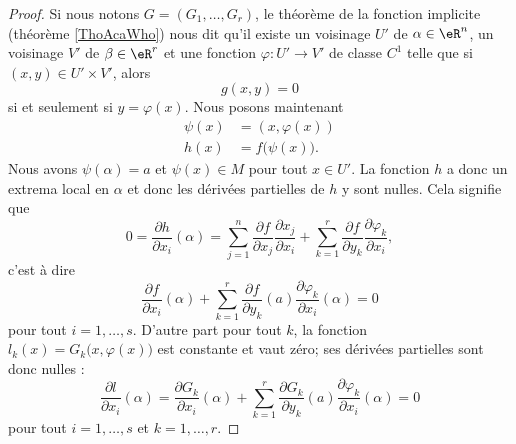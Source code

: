 \begin{proof}
    Si nous notons \( G=(G_1,\ldots, G_r)\), le théorème de la fonction implicite (théorème \ref{ThoAcaWho})  nous dit qu'il existe un voisinage \( U'\) de \( \alpha\in \eR^n\), un voisinage \( V'\) de \( \beta\in \eR^r\) et une fonction \( \varphi\colon U'\to V'\) de classe \( C^1\) telle que si \( (x,y)\in U'\times V'\), alors
    \begin{equation}
        g(x,y)=0
    \end{equation}
    si et seulement si \( y=\varphi(x)\). Nous posons maintenant
    \begin{subequations}
        \begin{align}
            \psi(x)&=(x,\varphi(x))\\
            h(x)&=f\big( \psi(x) \big).
        \end{align}
    \end{subequations}
    Nous avons \( \psi(\alpha)=a\) et \( \psi(x)\in M\) pour tout \( x\in U'\). La fonction \( h\) a donc un extrema local en \( \alpha\) et donc les dérivées partielles de \( h\) y sont nulles. Cela signifie que
    \begin{equation}
        0=\frac{ \partial h }{ \partial x_i }(\alpha)=\sum_{j=1}^n\frac{ \partial f }{ \partial x_j }\frac{ \partial x_j }{ \partial x_i }+\sum_{k=1}^r\frac{ \partial f }{ \partial y_k }\frac{ \partial \varphi_k }{ \partial x_i },
    \end{equation}
    c'est à dire
    \begin{equation}
        \frac{ \partial f }{ \partial x_i }(\alpha)+\sum_{k=1}^r\frac{ \partial f }{ \partial y_k }(a)\frac{ \partial \varphi_k }{ \partial x_i }(\alpha)=0
    \end{equation}
    pour tout \( i=1,\ldots, s\). D'autre part pour tout $k$, la fonction \( l_k(x)=G_k\big( x,\varphi(x) \big)\) est constante et vaut zéro; ses dérivées partielles sont donc nulles :
    \begin{equation}
        \frac{ \partial l }{ \partial x_i }(\alpha)=\frac{ \partial G_k }{ \partial x_i }(\alpha)+\sum_{k=1}^r\frac{ \partial G_k }{ \partial y_k }(a)\frac{ \partial \varphi_k }{ \partial x_i }(\alpha)=0
    \end{equation}
    pour tout \( i=1,\ldots, s\) et \( k=1,\ldots, r\).
    

\end{proof}
